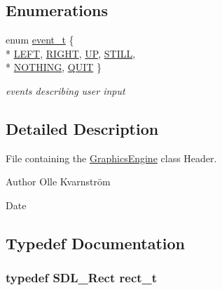 \subsection*{Enumerations}
\begin{DoxyCompactItemize}
\item 
enum \hyperlink{GraphicsEngine_8hh_a2fb9b58e4e5f14f40af8b4a1425841f8}{event\-\_\-t} \{ \\*
\hyperlink{GraphicsEngine_8hh_a2fb9b58e4e5f14f40af8b4a1425841f8adb45120aafd37a973140edee24708065}{L\-E\-F\-T}, 
\hyperlink{GraphicsEngine_8hh_a2fb9b58e4e5f14f40af8b4a1425841f8aec8379af7490bb9eaaf579cf17876f38}{R\-I\-G\-H\-T}, 
\hyperlink{GraphicsEngine_8hh_a2fb9b58e4e5f14f40af8b4a1425841f8aba595d8bca8bc5e67c37c0a9d89becfa}{U\-P}, 
\hyperlink{GraphicsEngine_8hh_a2fb9b58e4e5f14f40af8b4a1425841f8af63c0ddcabcef7eafa6b68908ffce431}{S\-T\-I\-L\-L}, 
\\*
\hyperlink{GraphicsEngine_8hh_a2fb9b58e4e5f14f40af8b4a1425841f8acfe24a7b308a82835c8a9a9a89bc4ca2}{N\-O\-T\-H\-I\-N\-G}, 
\hyperlink{GraphicsEngine_8hh_a2fb9b58e4e5f14f40af8b4a1425841f8a76bdc8adfd6c6463ab269ff4c06be9b4}{Q\-U\-I\-T}
 \}
\begin{DoxyCompactList}\small\item\em events describing user input \end{DoxyCompactList}\end{DoxyCompactItemize}


\subsection{Detailed Description}
File containing the \hyperlink{classGraphicsEngine}{Graphics\-Engine} class Header. \begin{DoxyAuthor}{Author}
Olle Kvarnström 
\end{DoxyAuthor}
\begin{DoxyDate}{Date}

\end{DoxyDate}


\subsection{Typedef Documentation}
\hypertarget{GraphicsEngine_8hh_a9a150f1ad43ec7de65cfe698cdae8bee}{
\subsubsection[{rect\-\_\-t}]{\setlength{\rightskip}{0pt plus 5cm}typedef S\-D\-L\-\_\-\-Rect {\bf rect\-\_\-t}}}\label{GraphicsEngine_8hh_a9a150f1ad43ec7de65cfe698cdae8bee}


